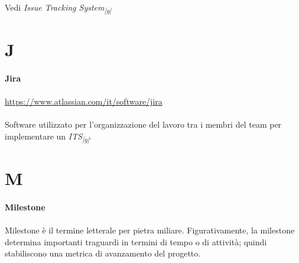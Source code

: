 \documentclass[10pt, a4paper]{article}
\newcommand{\pg}{\textsubscript{|g|}}
\begin{document}
\paragraph{}Vedi \textit{Issue Tracking System\pg}

\newpage
\section{J}

\vspace{2em}
\paragraph{Jira}\noindent\hrulefill
\paragraph{}\href{https://www.atlassian.com/it/software/jira}{https://www.atlassian.com/it/software/jira}\\\\
Software utilizzato per l'organizzazione del lavoro tra i membri del team per implementare un \textit{ITS\pg}.






\newpage
\section{M}

\vspace{2em}
\paragraph{Milestone}\noindent\hrulefill
\paragraph{}Milestone è il termine letterale per pietra miliare. Figurativamente, la milestone determina importanti traguardi in termini di tempo o di attività; quindi stabiliscono una metrica di avanzamento del progetto.

\vspace{2em}
\end{document}
